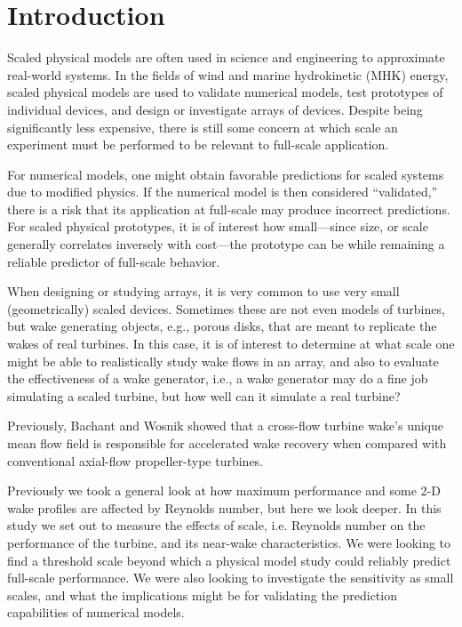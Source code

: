 \documentclass[energies,article,accept,moreauthors,pdftex,12pt,a4paper]{mdpi}
\begin{document}
\listoftodos

\section{Introduction}

Scaled physical models are often used in science and engineering to approximate
real-world systems. In the fields of wind and marine hydrokinetic (MHK) energy,
scaled physical models are used to validate numerical models, test prototypes of
individual devices, and design or investigate arrays of devices. Despite being
significantly less expensive, there is still some concern at which scale an
experiment must be performed to be relevant to full-scale application.

For numerical models, one might obtain favorable predictions for scaled systems
due to modified physics. If the numerical model is then considered
``validated,'' there is a risk that its application at full-scale may produce
incorrect predictions. For scaled physical prototypes, it is of interest how
small---since size, or scale generally correlates inversely with cost---the
prototype can be while remaining a reliable predictor of full-scale behavior.

When designing or studying arrays, it is very common to use very small
(geometrically) scaled devices. Sometimes these are not even models of turbines,
but wake generating objects, e.g., porous disks, that are meant to replicate the
wakes of real turbines. In this case, it is of interest to determine at what
scale one might be able to realistically study wake flows in an array, and also
to evaluate the effectiveness of a wake generator, i.e., a wake generator may do
a fine job simulating a scaled turbine, but how well can it simulate a real
turbine?

Previously, Bachant and Wosnik \cite{Bachant2015-JoT} showed that a cross-flow
turbine wake's unique mean flow field is responsible for accelerated wake
recovery when compared with conventional axial-flow propeller-type turbines.

Previously we took a general look at how maximum performance and some 2-D wake
profiles are affected by Reynolds number, but here we look deeper. In this study
we set out to measure the effects of scale, i.e. Reynolds number on the
performance of the turbine, and its near-wake characteristics. We were looking
to find a threshold scale beyond which a physical model study could reliably
predict full-scale performance. We were also looking to investigate the
sensitivity as small scales, and what the implications might be for validating
the prediction capabilities of numerical models.
\end{document}
